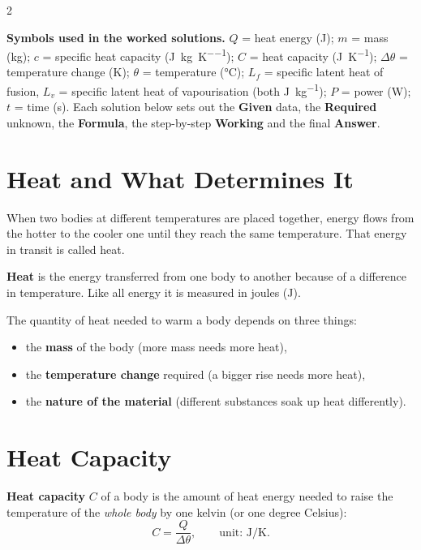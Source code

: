 \documentclass[10pt]{article}
\makeatletter
\let\theme@oldsection\section
\renewcommand{\section}{%
  \needspace{8\baselineskip}%
  \theme@oldsection}
\makeatother
\begin{document}
\begin{multicols}{2}
\begin{nb}
\textbf{Symbols used in the worked solutions.}
$Q$ = heat energy (\si{\joule});
$m$ = mass (\si{\kilogram});
$c$ = specific heat capacity (\si{\joule\per\kilogram\per\kelvin});
$C$ = heat capacity (\si{\joule\per\kelvin});
$\Delta\theta$ = temperature change (\si{\kelvin});
$\theta$ = temperature (\si{\degreeCelsius});
$L_f$ = specific latent heat of fusion,
$L_v$ = specific latent heat of vapourisation (both \si{\joule\per\kilogram});
$P$ = power (\si{\watt}); $t$ = time (\si{\second}).
Each solution below sets out the \textbf{Given} data, the
\textbf{Required} unknown, the \textbf{Formula}, the step-by-step
\textbf{Working} and the final \textbf{Answer}.
\end{nb}

\section{Heat and What Determines It}
When two bodies at different temperatures are placed together, energy
flows from the hotter to the cooler one until they reach the same
temperature. That energy in transit is called heat.

\begin{definition}
\textbf{Heat} is the energy transferred from one body to another
because of a difference in temperature. Like all energy it is measured
in joules (\si{\joule}).
\end{definition}

The quantity of heat needed to warm a body depends on three things:
\begin{itemize}[leftmargin=*,nosep]
  \item the \textbf{mass} of the body (more mass needs more heat),
  \item the \textbf{temperature change} required (a bigger rise needs
        more heat),
  \item the \textbf{nature of the material} (different substances soak
        up heat differently).
\end{itemize}

\section{Heat Capacity}
\begin{definition}
\textbf{Heat capacity} $C$ of a body is the amount of heat energy
needed to raise the temperature of the \emph{whole body} by one kelvin
(or one degree Celsius):
\[
  C = \frac{Q}{\Delta\theta}, \qquad \text{unit: } \si{\joule\per\kelvin}.
\]
\end{definition}


\end{multicols}
\end{document}
